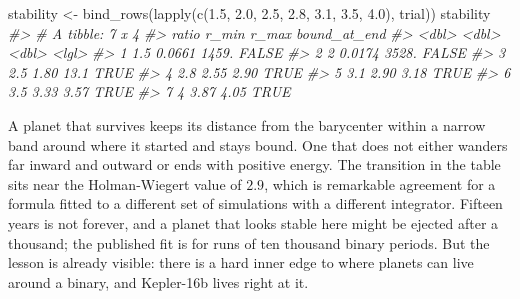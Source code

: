 \documentclass[
  10.5pt,
  letterpaper,
]{scrbook}
\newenvironment{Shaded}{\begin{snugshade}}{\end{snugshade}}
\newcommand{\CommentTok}[1]{\textcolor[rgb]{0.00,0.00,0.00}{\textit{#1}}}
\newcommand{\FloatTok}[1]{\textcolor[rgb]{0.00,0.00,0.00}{#1}}
\newcommand{\FunctionTok}[1]{\textcolor[rgb]{0.00,0.00,0.00}{#1}}
\newcommand{\NormalTok}[1]{\textcolor[rgb]{0.00,0.00,0.00}{#1}}
\newcommand{\OtherTok}[1]{\textcolor[rgb]{0.00,0.00,0.00}{#1}}
\theoremstyle{plain}
\theoremstyle{remark}
\begin{document}
\begin{Shaded}
\begin{Highlighting}[]
\NormalTok{stability }\OtherTok{\textless{}{-}} \FunctionTok{bind\_rows}\NormalTok{(}\FunctionTok{lapply}\NormalTok{(}\FunctionTok{c}\NormalTok{(}\FloatTok{1.5}\NormalTok{, }\FloatTok{2.0}\NormalTok{, }\FloatTok{2.5}\NormalTok{, }\FloatTok{2.8}\NormalTok{, }\FloatTok{3.1}\NormalTok{, }\FloatTok{3.5}\NormalTok{, }\FloatTok{4.0}\NormalTok{), trial))}
\NormalTok{stability}
\CommentTok{\#\textgreater{} \# A tibble: 7 x 4}
\CommentTok{\#\textgreater{}   ratio  r\_min   r\_max bound\_at\_end}
\CommentTok{\#\textgreater{}   \textless{}dbl\textgreater{}  \textless{}dbl\textgreater{}   \textless{}dbl\textgreater{} \textless{}lgl\textgreater{}       }
\CommentTok{\#\textgreater{} 1   1.5 0.0661 1459.   FALSE       }
\CommentTok{\#\textgreater{} 2   2   0.0174 3528.   FALSE       }
\CommentTok{\#\textgreater{} 3   2.5 1.80     13.1  TRUE        }
\CommentTok{\#\textgreater{} 4   2.8 2.55      2.90 TRUE        }
\CommentTok{\#\textgreater{} 5   3.1 2.90      3.18 TRUE        }
\CommentTok{\#\textgreater{} 6   3.5 3.33      3.57 TRUE        }
\CommentTok{\#\textgreater{} 7   4   3.87      4.05 TRUE}
\end{Highlighting}
\end{Shaded}

A planet that survives keeps its distance from the barycenter within a
narrow band around where it started and stays bound. One that does not
either wanders far inward and outward or ends with positive energy. The
transition in the table sits near the Holman-Wiegert value of \(2.9\),
which is remarkable agreement for a formula fitted to a different set of
simulations with a different integrator. Fifteen years is not forever,
and a planet that looks stable here might be ejected after a thousand;
the published fit is for runs of ten thousand binary periods. But the
lesson is already visible: there is a hard inner edge to where planets
can live around a binary, and Kepler-16b lives right at it.
\end{document}
